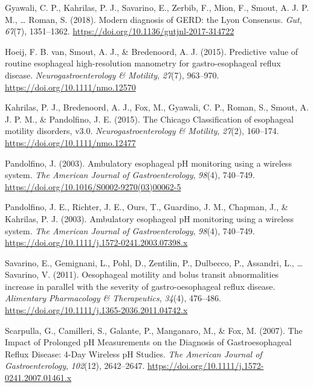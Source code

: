 \documentclass[english,man,floatsintext]{apa6}
\begin{document}
\leavevmode\hypertarget{ref-Gyawali2018}{}%
Gyawali, C. P., Kahrilas, P. J., Savarino, E., Zerbib, F., Mion, F., Smout, A. J. P. M., \ldots{} Roman, S. (2018). Modern diagnosis of GERD: the Lyon Consensus. \emph{Gut}, \emph{67}(7), 1351--1362. \url{https://doi.org/10.1136/gutjnl-2017-314722}

\leavevmode\hypertarget{ref-VanHoeij2015}{}%
Hoeij, F. B. van, Smout, A. J., \& Bredenoord, A. J. (2015). Predictive value of routine esophageal high-resolution manometry for gastro-esophageal reflux disease. \emph{Neurogastroenterology \& Motility}, \emph{27}(7), 963--970. \url{https://doi.org/10.1111/nmo.12570}

\leavevmode\hypertarget{ref-Kahrilas2015}{}%
Kahrilas, P. J., Bredenoord, A. J., Fox, M., Gyawali, C. P., Roman, S., Smout, A. J. P. M., \& Pandolfino, J. E. (2015). The Chicago Classification of esophageal motility disorders, v3.0. \emph{Neurogastroenterology \& Motility}, \emph{27}(2), 160--174. \url{https://doi.org/10.1111/nmo.12477}

\leavevmode\hypertarget{ref-Pandolfino2003a}{}%
Pandolfino, J. (2003). Ambulatory esophageal pH monitoring using a wireless system. \emph{The American Journal of Gastroenterology}, \emph{98}(4), 740--749. \url{https://doi.org/10.1016/S0002-9270(03)00062-5}

\leavevmode\hypertarget{ref-Pandolfino2003}{}%
Pandolfino, J. E., Richter, J. E., Ours, T., Guardino, J. M., Chapman, J., \& Kahrilas, P. J. (2003). Ambulatory esophageal pH monitoring using a wireless system. \emph{The American Journal of Gastroenterology}, \emph{98}(4), 740--749. \url{https://doi.org/10.1111/j.1572-0241.2003.07398.x}

\leavevmode\hypertarget{ref-Savarino2011}{}%
Savarino, E., Gemignani, L., Pohl, D., Zentilin, P., Dulbecco, P., Assandri, L., \ldots{} Savarino, V. (2011). Oesophageal motility and bolus transit abnormalities increase in parallel with the severity of gastro-oesophageal reflux disease. \emph{Alimentary Pharmacology \& Therapeutics}, \emph{34}(4), 476--486. \url{https://doi.org/10.1111/j.1365-2036.2011.04742.x}

\leavevmode\hypertarget{ref-Scarpulla2007a}{}%
Scarpulla, G., Camilleri, S., Galante, P., Manganaro, M., \& Fox, M. (2007). The Impact of Prolonged pH Measurements on the Diagnosis of Gastroesophageal Reflux Disease: 4-Day Wireless pH Studies. \emph{The American Journal of Gastroenterology}, \emph{102}(12), 2642--2647. \url{https://doi.org/10.1111/j.1572-0241.2007.01461.x}
\end{document}
